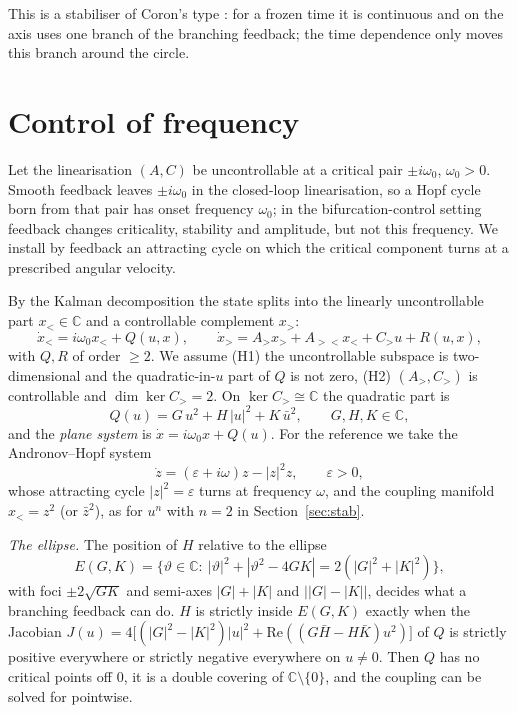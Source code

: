 \documentclass[11pt,reqno]{amsart}
\theoremstyle{plain}
\theoremstyle{remark}
\theoremstyle{definition}
\newcommand{\C}{\mathbb{C}}
\begin{document}
This is a stabiliser of Coron's type \cite{Coron1992,Coron2007}: for a frozen time it is continuous and on the axis uses one
branch of the branching feedback; the time dependence only moves this branch around the circle.

\section{Control of frequency}\label{sec:frequency}

Let the linearisation $(A,C)$ be uncontrollable at a critical pair $\pm i\omega_0$, $\omega_0>0$. Smooth feedback
leaves $\pm i\omega_0$ in the closed-loop linearisation, so a Hopf cycle born from that pair has onset frequency
$\omega_0$; in the bifurcation-control setting \cite{AbedFu1986,HamziKangBarbot2004} feedback changes criticality,
stability and amplitude, but not this frequency. We install by feedback an attracting cycle on which the critical
component turns at a prescribed angular velocity.

By the Kalman decomposition the state splits into the linearly uncontrollable part $x_<\in\C$ and a controllable complement $x_>$:
\[
  \dot x_<=i\omega_0 x_<+Q(u,x),\qquad \dot x_>=A_> x_>+A_{><}x_<+C_> u+R(u,x),
\]
with $Q,R$ of order $\ge2$. We assume (H1) the uncontrollable subspace is two-dimensional and the
quadratic-in-$u$ part of $Q$ is not zero, (H2) $(A_>,C_>)$ is controllable and $\dim\ker C_>=2$. On $\ker C_>\cong\C$
the quadratic part is
\[
  Q(u)=G\,u^{2}+H\,|u|^{2}+K\,\bar u^{2},\qquad G,H,K\in\C ,
\]
and the \emph{plane system} is $\dot x=i\omega_0x+Q(u)$. For the reference we take the Andronov--Hopf system
\[
  \dot z=(\varepsilon+i\omega)z-|z|^{2}z,\qquad \varepsilon>0,
\]
whose attracting cycle $|z|^{2}=\varepsilon$ turns at frequency $\omega$, and the coupling manifold $x_<=z^{2}$ (or $\bar z^{2}$), as for $u^{n}$ with $n=2$ in Section~\ref{sec:stab}.

\emph{The ellipse.} The position of $H$ relative to the ellipse
\[
  E(G,K)=\bigl\{\vartheta\in\C:\ |\vartheta|^{2}+|\vartheta^{2}-4GK|=2(|G|^{2}+|K|^{2})\bigr\},
\]
with foci $\pm2\sqrt{GK}$ and semi-axes $|G|+|K|$ and $\bigl||G|-|K|\bigr|$, decides what a branching feedback can do.
$H$ is strictly inside $E(G,K)$ exactly when the Jacobian
$J(u)=4\bigl[(|G|^{2}-|K|^{2})|u|^{2}+\mathrm{Re}((G\bar H-H\bar K)u^{2})\bigr]$ of $Q$ is strictly positive everywhere or
strictly negative everywhere on $u\ne0$. Then $Q$ has no critical points off $0$, it is
a double covering of $\C\setminus\{0\}$, and the coupling can be solved for pointwise.
\end{document}
